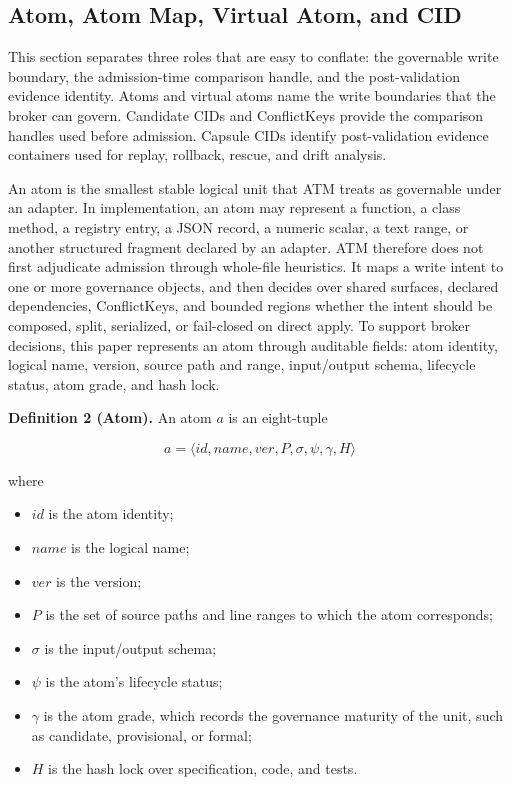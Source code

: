 \documentclass[9pt,letterpaper]{extarticle}
\begin{document}
\subsection{Atom, Atom Map, Virtual Atom, and CID}

This section separates three roles that are easy to conflate: the governable write boundary, the admission-time comparison handle, and the post-validation evidence identity. Atoms and virtual atoms name the write boundaries that the broker can govern. Candidate CIDs and ConflictKeys provide the comparison handles used before admission. Capsule CIDs identify post-validation evidence containers used for replay, rollback, rescue, and drift analysis.

An atom is the smallest stable logical unit that ATM treats as governable under an adapter. In implementation, an atom may represent a function, a class method, a registry entry, a JSON record, a numeric scalar, a text range, or another structured fragment declared by an adapter. ATM therefore does not first adjudicate admission through whole-file heuristics. It maps a write intent to one or more governance objects, and then decides over shared surfaces, declared dependencies, ConflictKeys, and bounded regions whether the intent should be composed, split, serialized, or fail-closed on direct apply. To support broker decisions, this paper represents an atom through auditable fields: atom identity, logical name, version, source path and range, input/output schema, lifecycle status, atom grade, and hash lock.

\textbf{Definition 2 (Atom).} An atom $a$ is an eight-tuple

\[
a = \langle id, name, \mathit{ver}, P, \sigma, \psi, \gamma, H \rangle
\]

where

\begin{itemize}
\item $id$ is the atom identity;
\item $name$ is the logical name;
\item $\mathit{ver}$ is the version;
\item $P$ is the set of source paths and line ranges to which the atom corresponds;
\item $\sigma$ is the input/output schema;
\item $\psi$ is the atom's lifecycle status;
\item $\gamma$ is the atom grade, which records the governance maturity of the unit, such as candidate, provisional, or formal;
\item $H$ is the hash lock over specification, code, and tests.
\end{itemize}
\end{document}
